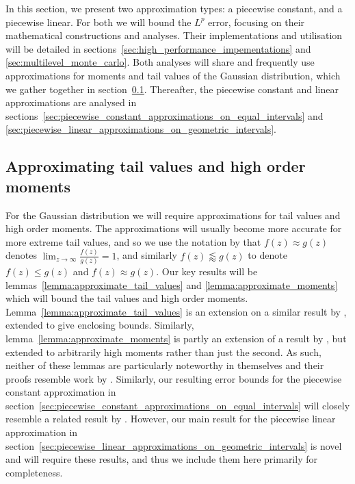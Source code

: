\documentclass[manuscript,review]{acmart}
\begin{document}
In this section, we present two approximation types: a piecewise constant, and a piecewise linear. For both we will bound the $ L^p $ error, focusing on their mathematical constructions and analyses. Their implementations and utilisation will be detailed in sections~\ref{sec:high_performance_impementations} and \ref{sec:multilevel_monte_carlo}. Both analyses will share and frequently use approximations for moments and tail values of the Gaussian distribution, which we gather together in section~\ref{sec:approximating_tail_values_and_high_order_moments}. Thereafter, the piecewise constant and linear approximations are analysed in sections~\ref{sec:piecewise_constant_approximations_on_equal_intervals} and \ref{sec:piecewise_linear_approximations_on_geometric_intervals}.

\subsection{Approximating tail values and high order moments}
\label{sec:approximating_tail_values_and_high_order_moments}

For the Gaussian distribution we will require approximations for tail values and high order moments. The approximations will usually become more accurate for more extreme tail values, and so we use the notation by \citet{giles2019random_quadrature} that $ f(z) \approx g(z) $ denotes $ \lim_{z\to\infty} \tfrac{f(z)}{g(z)} = 1 $, and similarly $ f(z) \lessapprox g(z) $ to denote $ f(z) \leq g(z) $ and $ f(z) \approx g(z) $. Our key results will be lemmas~\ref{lemma:approximate_tail_values} and \ref{lemma:approximate_moments} which will bound the tail values and high order moments. Lemma~\ref{lemma:approximate_tail_values} is an extension on a similar result by \citet[lemma~7]{giles2019random_quadrature}, extended to give enclosing bounds. Similarly, lemma~\ref{lemma:approximate_moments} is partly an extension of a result by \citet[lemma~9]{giles2019random_quadrature}, but extended to arbitrarily high moments rather than just the second. As such, neither of these lemmas are particularly noteworthy in themselves and their proofs resemble work by \citet[appendix~A]{giles2019random_quadrature}. Similarly, our resulting error bounds for the piecewise constant approximation in section~\ref{sec:piecewise_constant_approximations_on_equal_intervals} will closely resemble a related result by \citet[theorem~1]{giles2019random_quadrature}. However, our main result for the piecewise linear approximation in section~\ref{sec:piecewise_linear_approximations_on_geometric_intervals} is novel and will require these results, and thus we include them here primarily for completeness. 
\end{document}
